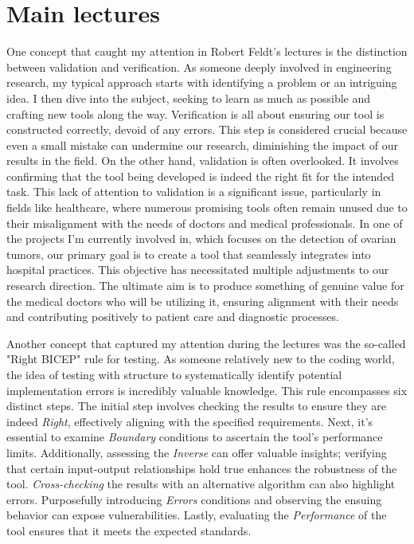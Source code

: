 \documentclass[11pt]{article}
\begin{document}
\section{Main lectures}

One concept that caught my attention in Robert Feldt's lectures is the distinction between validation and verification. As someone deeply involved in engineering research, my typical approach starts with identifying a problem or an intriguing idea. I then dive into the subject, seeking to learn as much as possible and crafting new tools along the way.
Verification is all about ensuring our tool is constructed correctly, devoid of any errors. This step is considered crucial because even a small mistake can undermine our research, diminishing the impact of our results in the field. On the other hand, validation is often overlooked. It involves confirming that the tool being developed is indeed the right fit for the intended task. This lack of attention to validation is a significant issue, particularly in fields like healthcare, where numerous promising tools often remain unused due to their misalignment with the needs of doctors and medical professionals.
In one of the projects I'm currently involved in, which focuses on the detection of ovarian tumors, our primary goal is to create a tool that seamlessly integrates into hospital practices. This objective has necessitated multiple adjustments to our research direction. The ultimate aim is to produce something of genuine value for the medical doctors who will be utilizing it, ensuring alignment with their needs and contributing positively to patient care and diagnostic processes.

Another concept that captured my attention during the lectures was the so-called "Right BICEP" rule for testing. As someone relatively new to the coding world, the idea of testing with structure to systematically identify potential implementation errors is incredibly valuable knowledge. This rule encompasses six distinct steps.
The initial step involves checking the results to ensure they are indeed \textit{Right}, effectively aligning with the specified requirements. Next, it's essential to examine \textit{Boundary} conditions to ascertain the tool's performance limits. Additionally, assessing the \textit{Inverse} can offer valuable insights; verifying that certain input-output relationships hold true enhances the robustness of the tool.
\textit{Cross-checking} the results with an alternative algorithm can also highlight errors. Purposefully introducing \textit{Errors} conditions and observing the ensuing behavior can expose vulnerabilities. Lastly, evaluating the \textit{Performance} of the tool ensures that it meets the expected standards.
\end{document}
